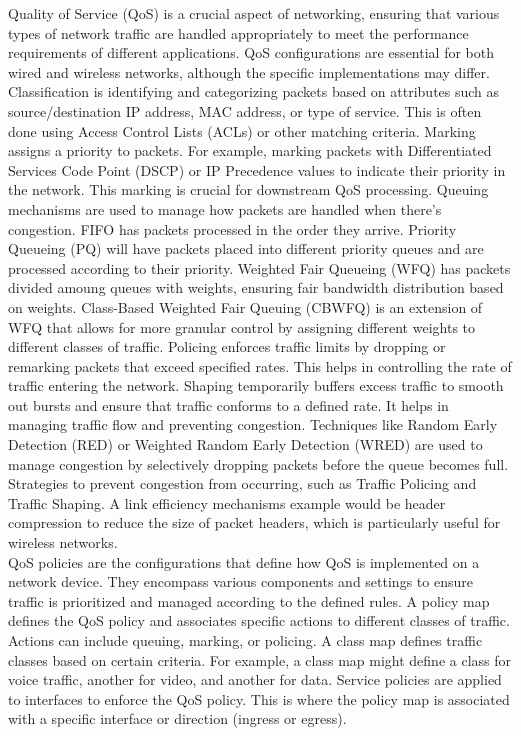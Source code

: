\documentclass{article}
\begin{document}
	Quality of Service (QoS) is a crucial aspect of networking, ensuring that various types of network traffic are handled appropriately to meet the performance requirements of different applications. QoS configurations are essential for both wired and wireless networks, although the specific implementations may differ. Classification is identifying and categorizing packets based on attributes such as source/destination IP address, MAC address, or type of service. This is often done using Access Control Lists (ACLs) or other matching criteria. Marking assigns a priority to packets. For example, marking packets with Differentiated Services Code Point (DSCP) or IP Precedence values to indicate their priority in the network. This marking is crucial for downstream QoS processing. Queuing mechanisms are used to manage how packets are handled when there’s congestion. FIFO has packets processed in the order they arrive. Priority Queueing (PQ) will have packets placed into different priority queues and are processed according to their priority. Weighted Fair Queueing (WFQ) has packets divided amoung queues with weights, ensuring fair bandwidth distribution based on weights. Class-Based Weighted Fair Queuing (CBWFQ) is an extension of WFQ that allows for more granular control by assigning different weights to different classes of traffic. Policing enforces traffic limits by dropping or remarking packets that exceed specified rates. This helps in controlling the rate of traffic entering the network. Shaping temporarily buffers excess traffic to smooth out bursts and ensure that traffic conforms to a defined rate. It helps in managing traffic flow and preventing congestion. Techniques like Random Early Detection (RED) or Weighted Random Early Detection (WRED) are used to manage congestion by selectively dropping packets before the queue becomes full. Strategies to prevent congestion from occurring, such as Traffic Policing and Traffic Shaping. A link efficiency mechanisms example would be header compression to reduce the size of packet headers, which is particularly useful for wireless networks.\\

	QoS policies are the configurations that define how QoS is implemented on a network device. They encompass various components and settings to ensure traffic is prioritized and managed according to the defined rules. A policy map defines the QoS policy and associates specific actions to different classes of traffic. Actions can include queuing, marking, or policing. A class map defines traffic classes based on certain criteria. For example, a class map might define a class for voice traffic, another for video, and another for data. Service policies are applied to interfaces to enforce the QoS policy. This is where the policy map is associated with a specific interface or direction (ingress or egress).\\
\end{document}
